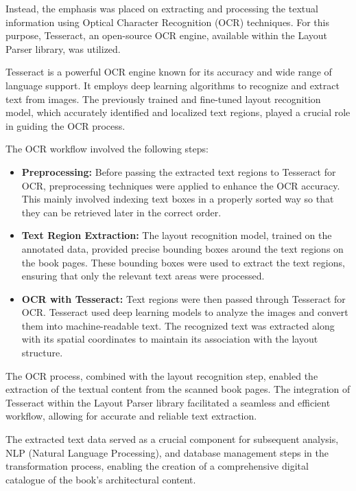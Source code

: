 Instead, the emphasis was placed on extracting and processing the textual information using Optical Character Recognition (OCR) techniques. 
For this purpose, Tesseract, an open-source OCR engine, available within the Layout Parser library, was utilized.

Tesseract is a powerful OCR engine known for its accuracy and wide range of language support. It employs deep learning algorithms to recognize and extract text from images. The previously trained and fine-tuned layout recognition model, which accurately identified and localized text regions, played a crucial role in guiding the OCR process.

The OCR workflow involved the following steps:

\begin{itemize}
    \item \textbf{Preprocessing:} Before passing the extracted text regions to Tesseract for OCR, preprocessing techniques were applied to enhance the OCR accuracy. This mainly involved indexing text boxes in a properly sorted way so that they can be retrieved later in the correct order.
    \item \textbf{Text Region Extraction:} The layout recognition model, trained on the annotated data, provided precise bounding boxes around the text regions on the book pages. These bounding boxes were used to extract the text regions, ensuring that only the relevant text areas were processed.
    \item \textbf{OCR with Tesseract:} Text regions were then passed through Tesseract for OCR. Tesseract used deep learning models to analyze the images and convert them into machine-readable text. The recognized text was extracted along with its spatial coordinates to maintain its association with the layout structure.
    
\end{itemize}

The OCR process, combined with the layout recognition step, enabled the extraction of the textual content from the scanned book pages. The integration of Tesseract within the Layout Parser library facilitated a seamless and efficient workflow, allowing for accurate and reliable text extraction.

The extracted text data served as a crucial component for subsequent analysis, NLP (Natural Language Processing), and database management steps in the transformation process, enabling the creation of a comprehensive digital catalogue of the book's architectural content.


